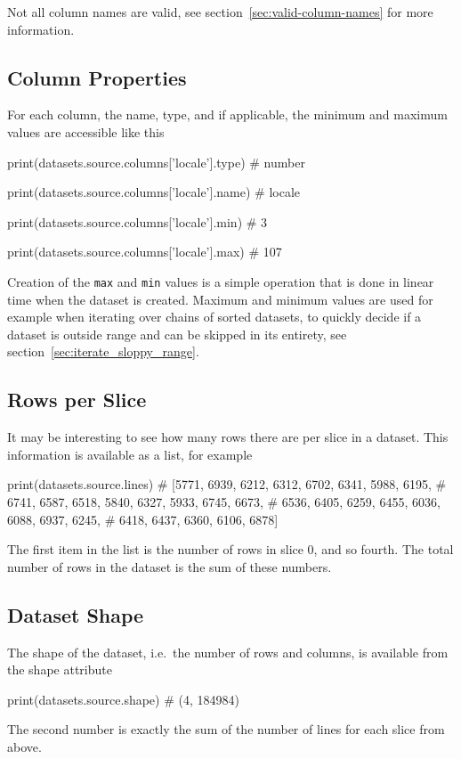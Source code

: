 Not all column names are valid, see
section~\ref{sec:valid-column-names} for more information.

\subsection{Column Properties}
For each column, the name, type, and if applicable, the minimum and
maximum values are accessible like this
\begin{python}
print(datasets.source.columns['locale'].type)
# number

print(datasets.source.columns['locale'].name)
# locale

print(datasets.source.columns['locale'].min)
# 3

print(datasets.source.columns['locale'].max)
# 107
\end{python}
Creation of the \texttt{max} and \texttt{min} values is a simple
operation that is done in linear time when the dataset is created.
Maximum and minimum values are used for example when iterating over
chains of sorted datasets, to quickly decide if a dataset is outside
range and can be skipped in its entirety, see
section~\ref{sec:iterate_sloppy_range}.


\subsection{Rows per Slice}

It may be interesting to see how many rows there are per slice in a
dataset.  This information is available as a list, for example
\begin{python}
print(datasets.source.lines)
# [5771, 6939, 6212, 6312, 6702, 6341, 5988, 6195,
#  6741, 6587, 6518, 5840, 6327, 5933, 6745, 6673,
#  6536, 6405, 6259, 6455, 6036, 6088, 6937, 6245,
#  6418, 6437, 6360, 6106, 6878]
\end{python}
The first item in the list is the number of rows in slice 0, and so
fourth.  The total number of rows in the dataset is the sum of these
numbers.


\subsection{Dataset Shape}
The shape of the dataset, i.e.\ the number of rows and columns, is
available from the shape attribute
\begin{python}
print(datasets.source.shape)
# (4, 184984)
\end{python}
The second number is exactly the sum of the number of lines for each
slice from above.


